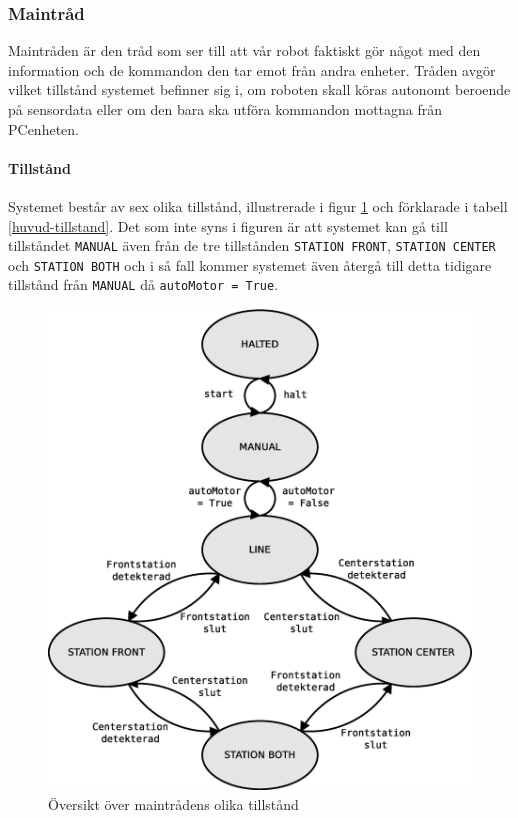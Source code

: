 \subsubsection{Maintråd}
Maintråden är den tråd som ser till att vår robot faktiskt gör något med den information och de kommandon den tar emot från andra enheter. Tråden avgör vilket tillstånd systemet befinner sig i, om roboten skall köras autonomt beroende på sensordata eller om den bara ska utföra kommandon mottagna från PCenheten.

\paragraph{Tillstånd}

Systemet består av sex olika tillstånd, illustrerade i figur \ref{huvud-tillstand-diagram} och förklarade i tabell \ref{huvud-tillstand}. Det som inte syns i figuren är att systemet kan gå till tillståndet \texttt{MANUAL} även från de tre tillstånden \texttt{STATION FRONT}, \texttt{STATION CENTER} och \texttt{STATION BOTH} och i så fall kommer systemet även återgå till detta tidigare tillstånd från \texttt{MANUAL} då \texttt{autoMotor = True}. 

\begin{figure}[h!]
	\centering
	\includegraphics[scale=0.4]{grafik/huvud-tillstand}
	\caption{Översikt över maintrådens olika tillstånd} \label{huvud-tillstand-diagram}
\end{figure}

